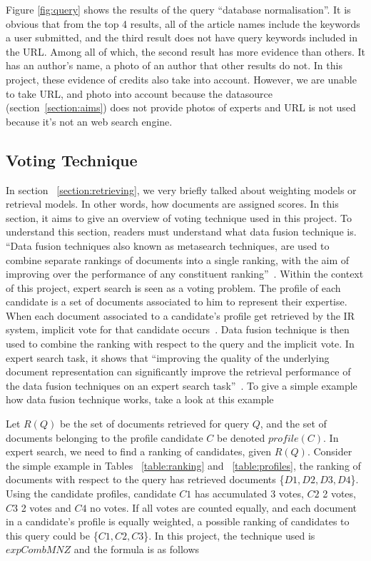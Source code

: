 Figure \ref{fig:query} shows the results of the query ``database normalisation''. It is obvious that from the top 4 results, all of the article names
include the keywords a user submitted, and the third result does not have query keywords included in the URL. Among all of which, the second result has more 
evidence than others. It has an author's name, a photo of an author that other results do not. In this project, these evidence of credits also take into account.
However, we are unable to take URL, and photo into account because the datasource (section~\ref{section:aims})
does not provide photos of experts and URL is not used because it's not an web search engine.

\subsection{Voting Technique}\label{section:voting}
In section ~\ref{section:retrieving}, we very briefly talked about weighting models or retrieval models. In other words, how documents are assigned scores. In this section,
it aims to give an overview of voting technique used in this project. To understand this section, readers must understand what data fusion technique is. 
``Data fusion techniques also known as metasearch techniques, are used to combine separate rankings of documents into a single ranking,
with the aim of improving over the performance of any constituent ranking''~\cite[P. 388]{expertsearch}. Within the context of this project, 
expert search is seen as a voting problem. The profile of each candidate is a set of documents associated to him to represent their expertise.
When each document associated to a candidate's profile get retrieved by the IR system, implicit vote for that candidate occurs~\cite[P. 389]{expertsearch}.
Data fusion technique is then used to combine the ranking with respect to the query and the implicit vote. In expert search task, it shows that 
``improving the quality of the underlying document representation can significantly improve the retrieval performance of the data fusion techniques 
on an expert search task''~\cite[P. 387]{expertsearch}. To give a simple example how data fusion technique works, take a look at this example

Let $R(Q)$ be the set of documents retrieved for query $Q$, and the set of documents belonging to the profile candidate $C$ be denoted $profile(C)$. In expert
search, we need to find a ranking of candidates, given $R(Q)$. Consider the simple example in Tables ~\ref{table:ranking} and ~\ref{table:profiles},
the ranking of documents with respect to the query has retrieved documents \{$D1, D2, D3, D4$\}. Using the candidate profiles, candidate $C1$ has accumulated
3 votes, $C2$ 2 votes, $C3$ 2 votes and $C4$ no votes. If all votes are counted equally, and each document in a candidate's profile is equally weighted, a possible
ranking of candidates to this query could be \{$C1, C2, C3$\}. In this project, the technique used is $expCombMNZ$ and the formula is as follows

